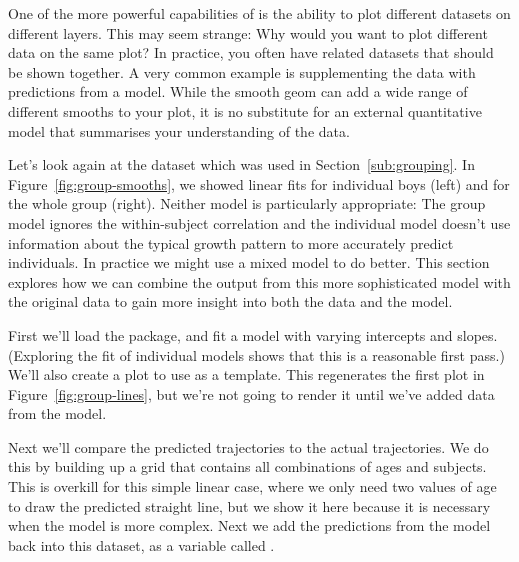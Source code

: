 One of the more powerful capabilities of \ggplot is the ability to plot different datasets on different layers.  This may seem strange: Why would you want to plot different data on the same plot?  In practice, you often have related datasets that should be shown together.  A very common example is supplementing the data with predictions from a model.  While the smooth geom can add a wide range of different smooths to your plot, it is no substitute for an external quantitative model that summarises your understanding of the data.

Let's look again at the  dataset which was used in Section~\ref{sub:grouping}.  In Figure~\ref{fig:group-smooths}, we showed linear fits for individual boys (left) and for the whole group (right).  Neither model is particularly appropriate: The group model ignores the within-subject correlation and the individual model doesn't use information about the typical growth pattern to more accurately predict individuals.  In practice we might use a mixed model to do better.  This section explores how we can combine the output from this more sophisticated model with the original data to gain more insight into both the data and the model.

First we'll load the  package, and fit a model with varying intercepts and slopes.  (Exploring the fit of individual models shows that this is a reasonable first pass.)  We'll also create a plot to use as a template.  This regenerates the first plot in Figure~\ref{fig:group-lines}, but we're not going to render it until we've added data from the model.

% 


Next we'll compare the predicted trajectories to the actual trajectories.  We do this by building up a grid that contains all combinations of ages and subjects.  This is overkill for this simple linear case, where we only need two values of age to draw the predicted straight line, but we show it here because it is necessary when the model is more complex.  Next we add the predictions from the model back into this dataset, as a variable called .  

% 
% 


